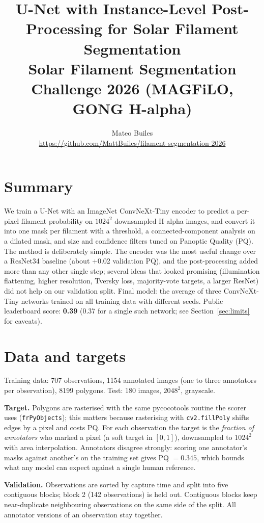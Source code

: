 \documentclass[10pt]{article}
\title{U-Net with Instance-Level Post-Processing for Solar Filament Segmentation\\
\large Solar Filament Segmentation Challenge 2026 (MAGFiLO, GONG H-alpha)}
\author{Mateo Builes\\ \url{https://github.com/MattBuiles/filament-segmentation-2026}}
\date{}
\begin{document}
\maketitle

\section{Summary}
We train a U-Net with an ImageNet ConvNeXt-Tiny encoder to predict a per-pixel filament probability on $1024^2$
downsampled H-alpha images, and convert it into one mask per filament with a threshold, a connected-component analysis on
a dilated mask, and size and confidence filters tuned on Panoptic Quality (PQ). The method is deliberately simple. The
encoder was the most useful change over a ResNet34 baseline (about +0.02 validation PQ), and the post-processing added
more than any other single step; several ideas that looked promising (illumination flattening, higher resolution, Tversky
loss, majority-vote targets, a larger ResNet) did not help on our validation split. Final model: the average of three
ConvNeXt-Tiny networks trained on all training data with different seeds. Public leaderboard score:
\textbf{0.39} (0.37 for a single such network; see Section~\ref{sec:limits} for caveats).

\section{Data and targets}
Training data: 707 observations, 1154 annotated images (one to three annotators per observation), 8199 polygons.
Test: 180 images, $2048^2$, grayscale.

\textbf{Target.} Polygons are rasterised with the same pycocotools routine the scorer uses (\texttt{frPyObjects}); this
matters because rasterising with \texttt{cv2.fillPoly} shifts edges by a pixel and costs PQ. For each observation the
target is the \emph{fraction of annotators} who marked a pixel (a soft target in $[0,1]$), downsampled to $1024^2$ with
area interpolation. Annotators disagree strongly: scoring one annotator's masks against another's on the training set
gives PQ $=0.345$, which bounds what any model can expect against a single human reference.

\textbf{Validation.} Observations are sorted by capture time and split into five contiguous blocks; block 2 (142
observations) is held out. Contiguous blocks keep near-duplicate neighbouring observations on the same side of the split.
All annotator versions of an observation stay together.
\end{document}
